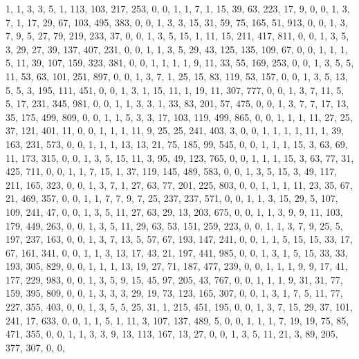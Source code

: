 \begin{code}
\begin{hide}
{     {1, 1, 3, 3, 5, 1, 113, 103, 217, 253, 0, 0},
     {1, 1, 7, 1, 15, 39, 63, 223, 17, 9, 0, 0},
     {1, 3, 7, 1, 17, 29, 67, 103, 495, 383, 0, 0},
     {1, 3, 3, 15, 31, 59, 75, 165, 51, 913, 0, 0},
     {1, 3, 7, 9, 5, 27, 79, 219, 233, 37, 0, 0},
     {1, 3, 5, 15, 1, 11, 15, 211, 417, 811, 0, 0},
     {1, 3, 5, 3, 29, 27, 39, 137, 407, 231, 0, 0},
     {1, 1, 3, 5, 29, 43, 125, 135, 109, 67, 0, 0},
     {1, 1, 1, 5, 11, 39, 107, 159, 323, 381, 0, 0},
     {1, 1, 1, 1, 9, 11, 33, 55, 169, 253, 0, 0},
     {1, 3, 5, 5, 11, 53, 63, 101, 251, 897, 0, 0},
     {1, 3, 7, 1, 25, 15, 83, 119, 53, 157, 0, 0},
     {1, 3, 5, 13, 5, 5, 3, 195, 111, 451, 0, 0},
     {1, 3, 1, 15, 11, 1, 19, 11, 307, 777, 0, 0},
     {1, 3, 7, 11, 5, 5, 17, 231, 345, 981, 0, 0},
     {1, 1, 3, 3, 1, 33, 83, 201, 57, 475, 0, 0},
     {1, 3, 7, 7, 17, 13, 35, 175, 499, 809, 0, 0},
     {1, 1, 5, 3, 3, 17, 103, 119, 499, 865, 0, 0},
     {1, 1, 1, 11, 27, 25, 37, 121, 401, 11, 0, 0},
     {1, 1, 1, 11, 9, 25, 25, 241, 403, 3, 0, 0},
     {1, 1, 1, 1, 11, 1, 39, 163, 231, 573, 0, 0},
     {1, 1, 1, 13, 13, 21, 75, 185, 99, 545, 0, 0},
     {1, 1, 1, 15, 3, 63, 69, 11, 173, 315, 0, 0},
     {1, 3, 5, 15, 11, 3, 95, 49, 123, 765, 0, 0},
     {1, 1, 1, 15, 3, 63, 77, 31, 425, 711, 0, 0},
     {1, 1, 7, 15, 1, 37, 119, 145, 489, 583, 0, 0},
     {1, 3, 5, 15, 3, 49, 117, 211, 165, 323, 0, 0},
     {1, 3, 7, 1, 27, 63, 77, 201, 225, 803, 0, 0},
     {1, 1, 1, 11, 23, 35, 67, 21, 469, 357, 0, 0},
     {1, 1, 7, 7, 9, 7, 25, 237, 237, 571, 0, 0},
     {1, 1, 3, 15, 29, 5, 107, 109, 241, 47, 0, 0},
     {1, 3, 5, 11, 27, 63, 29, 13, 203, 675, 0, 0},
     {1, 1, 3, 9, 9, 11, 103, 179, 449, 263, 0, 0},
     {1, 3, 5, 11, 29, 63, 53, 151, 259, 223, 0, 0},
     {1, 1, 3, 7, 9, 25, 5, 197, 237, 163, 0, 0},
     {1, 3, 7, 13, 5, 57, 67, 193, 147, 241, 0, 0},
     {1, 1, 5, 15, 15, 33, 17, 67, 161, 341, 0, 0},
     {1, 1, 3, 13, 17, 43, 21, 197, 441, 985, 0, 0},
     {1, 3, 1, 5, 15, 33, 33, 193, 305, 829, 0, 0},
     {1, 1, 1, 13, 19, 27, 71, 187, 477, 239, 0, 0},
     {1, 1, 1, 9, 9, 17, 41, 177, 229, 983, 0, 0},
     {1, 3, 5, 9, 15, 45, 97, 205, 43, 767, 0, 0},
     {1, 1, 1, 9, 31, 31, 77, 159, 395, 809, 0, 0},
     {1, 3, 3, 3, 29, 19, 73, 123, 165, 307, 0, 0},
     {1, 3, 1, 7, 5, 11, 77, 227, 355, 403, 0, 0},
     {1, 3, 5, 5, 25, 31, 1, 215, 451, 195, 0, 0},
     {1, 3, 7, 15, 29, 37, 101, 241, 17, 633, 0, 0},
     {1, 1, 5, 1, 11, 3, 107, 137, 489, 5, 0, 0},
     {1, 1, 1, 7, 19, 19, 75, 85, 471, 355, 0, 0},
     {1, 1, 3, 3, 9, 13, 113, 167, 13, 27, 0, 0},
     {1, 3, 5, 11, 21, 3, 89, 205, 377, 307, 0, 0},
}
\end{hide}
\end{code}
